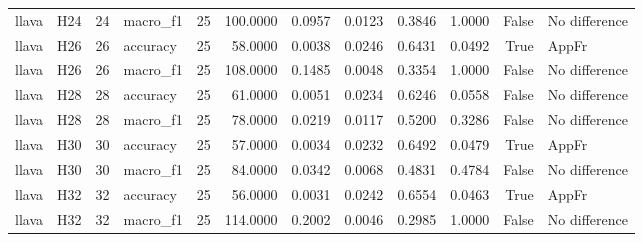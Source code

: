 \begin{table}[tbp]
\begin{tabular}{llrlrrrrrrrl}
llava & H24 & 24 & macro\_f1 & 25 & 100.0000 & 0.0957 & 0.0123 & 0.3846 & 1.0000 & False & No difference \\
llava & H26 & 26 & accuracy & 25 & 58.0000 & 0.0038 & 0.0246 & 0.6431 & 0.0492 & True & AppFr \\
llava & H26 & 26 & macro\_f1 & 25 & 108.0000 & 0.1485 & 0.0048 & 0.3354 & 1.0000 & False & No difference \\
llava & H28 & 28 & accuracy & 25 & 61.0000 & 0.0051 & 0.0234 & 0.6246 & 0.0558 & False & No difference \\
llava & H28 & 28 & macro\_f1 & 25 & 78.0000 & 0.0219 & 0.0117 & 0.5200 & 0.3286 & False & No difference \\
llava & H30 & 30 & accuracy & 25 & 57.0000 & 0.0034 & 0.0232 & 0.6492 & 0.0479 & True & AppFr \\
llava & H30 & 30 & macro\_f1 & 25 & 84.0000 & 0.0342 & 0.0068 & 0.4831 & 0.4784 & False & No difference \\
llava & H32 & 32 & accuracy & 25 & 56.0000 & 0.0031 & 0.0242 & 0.6554 & 0.0463 & True & AppFr \\
llava & H32 & 32 & macro\_f1 & 25 & 114.0000 & 0.2002 & 0.0046 & 0.2985 & 1.0000 & False & No difference \\
\bottomrule
\end{tabular}
\end{table}
